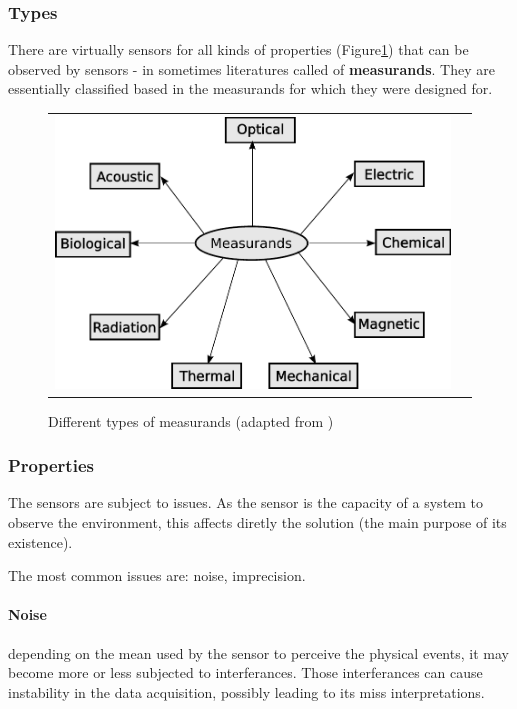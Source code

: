 \subsubsection{Types}

There are virtually sensors for all kinds of properties (Figure\ref{fig:sensors}) that can be observed by sensors - in sometimes literatures called of \textbf{measurands}. They are essentially classified based in the measurands for which they were designed for.

\begin{figure}[h]
   \centering
     \begin{tabular}{lr}
       \includegraphics[scale=0.70]{img/fig:sensors}
     \end{tabular}
   \caption{Different types of measurands (adapted from \cite{WhiteRichard})}
   \label{fig:sensors}
 \end{figure}

\subsubsection{Properties}

The sensors are subject to issues. As the sensor is the capacity of a system to observe the environment, this affects diretly the solution (the main purpose of its existence).

The most common issues are: noise, imprecision. 

\paragraph{Noise} depending on the mean used by the sensor to perceive the physical events, it may become more or less subjected to interferances. Those interferances can cause instability in the data acquisition, possibly leading to its miss interpretations.

